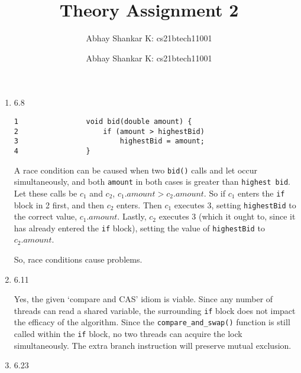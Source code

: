 \documentclass{amsart}
\author{Abhay Shankar K: cs21btech11001}
\newcommand{\me}{
    \author{Abhay Shankar K: cs21btech11001}
    \maketitle
}
\begin{document}
\title{Theory Assignment 2}
\me

\newcommand{\brak}[1]{\ensuremath{\left(#1\right)}} %
\newcommand{\abrak}[1]{\ensuremath{\left\langle#1\right\rangle}}
\newcommand{\sbrak}[1]{\ensuremath{\left[#1\right]}}
\newcommand{\cbrak}[1]{\ensuremath{\left\{#1\right\}}}
    \begin{enumerate}
        \item 6.8
        
            \begin{lstlisting}[escapechar=@]
1                void bid(double amount) { 
2                    if (amount > highestBid)
3                        highestBid = amount;
4                }
            \end{lstlisting}

            A race condition can be caused when two \texttt{bid()} calls and let occur simultaneously, and both \texttt{amount} in both cases is greater than \texttt{highest bid}.
            Let these calls be \(c_1\) and \(c_2\), \(c_1.amount > c_2.amount\). So if \(c_1\) enters the \texttt{if} block in 2 first, and then \(c_2\) enters. 
            Then \(c_1\) executes 3, setting \texttt{highestBid} to the correct value, \(c_1.amount\). Lastly, \(c_2\) executes 3 (which it ought to, since it has already entered the \texttt{if} block), setting the value of \texttt{highestBid} to \(c_2.amount\).

            So, race conditions cause problems.

        \item 6.11
            
            Yes, the given `compare and CAS' idiom is viable. Since any number of threads can read a shared variable, the surrounding \texttt{if} block does not impact the efficacy of the algorithm.
            Since the \texttt{compare\_and\_swap()} function is still called within the \texttt{if} block, no two threads can acquire the lock simultaneously.
            The extra branch instruction will preserve mutual exclusion.

        \item 6.23
        

\end{enumerate}
\end{document}
